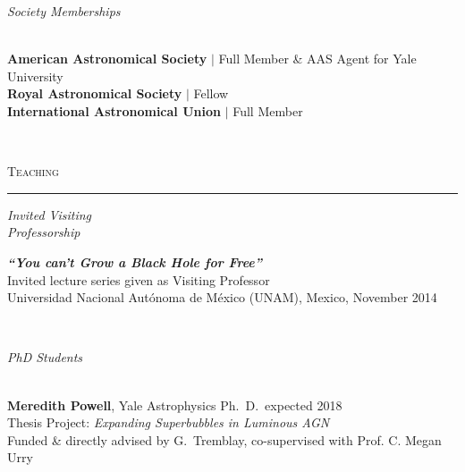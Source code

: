 \documentclass[11pt]{article}
\makeatletter
\def\vhrulefill#1{\leavevmode\leaders\hrule\@height#1\hfill \kern\z@}
\makeatother
\begin{document}
\vspace{4mm}


\hspace{2.5mm} \parbox{1.5in}{\textit{Society Memberships \\\\}} \parbox{5.15in}{ \textbf{American Astronomical Society} $|$ Full Member \& AAS Agent for Yale University \\ \textbf{Royal Astronomical Society} $|$ Fellow \\ \textbf{International Astronomical Union} $|$ Full Member}\\




\vspace{4mm}


\textsc{Teaching} \vhrulefill{0.4pt}


\vspace{6mm}


\hspace{2.5mm} \parbox{1.5in}{\textit{Invited Visiting \\ Professorship \\ }} \parbox{5.15in}{ \textit{\textbf{``You can't Grow a Black Hole for Free''}}\\ Invited lecture series given as Visiting Professor \\ Universidad Nacional Aut\'{o}noma de M\'{e}xico (UNAM), Mexico, November 2014}\\

\vspace{4mm}


\hspace{2.5mm} \parbox{1.5in}{\textit{PhD Students \\\\}} \parbox{5.15in}{
\textbf{Meredith Powell}, Yale Astrophysics Ph.~D.~expected 2018\\ Thesis Project: \textit{Expanding Superbubbles in Luminous AGN}\\
Funded \& directly advised by G.~Tremblay,
co-supervised with Prof. C. Megan Urry
}\\



\vspace{4mm}
\end{document}
